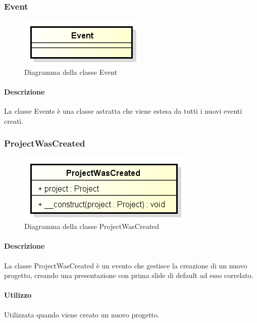 \subsubsection{Event}
\begin{figure}[h]
	\centering
	\includegraphics[width=0.5\linewidth]{img/premi_back_end_event}
	\caption[Diagramma della classe Event]{Diagramma della classe Event}
	\label{fig:premi_back_end_event}
\end{figure}


\paragraph{Descrizione}
La classe Events è una classe astratta che viene estesa da tutti i nuovi eventi creati.

\newpage
\subsubsection{ProjectWasCreated}
\begin{figure}[h]
	\centering
	\includegraphics[width=0.5\linewidth]{img/premi_back_end_project_was_created}
	\caption[Diagramma della classe ProjectWasCreated]{Diagramma della classe ProjectWasCreated}
	\label{fig:premi_back_end_project_was_created}
\end{figure}


\paragraph{Descrizione}
La classe ProjectWasCreated è un evento che gestisce la creazione di un nuovo progetto, creando una presentazione con prima slide di default ad esso correlato.

\paragraph{Utilizzo}
Utilizzata quando viene creato un nuovo progetto.

